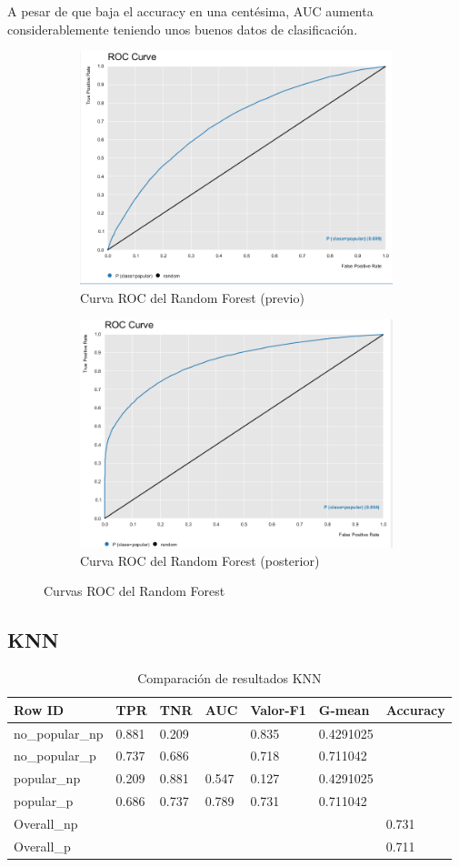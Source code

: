 A pesar de que baja el accuracy en una centésima, AUC aumenta considerablemente teniendo unos buenos datos de clasificación.

\begin{figure}[H]
	\begin{subfigure}{.5\textwidth}
		\centering
		\includegraphics[width=.4\linewidth]{roc-rf-p.png}
		\caption{Curva ROC del Random Forest (previo)}
		\label{fig:rcrfp}
	\end{subfigure}%
	\begin{subfigure}{.5\textwidth}
		\centering
		\includegraphics[width=.4\linewidth]{rc-rf.png}
		\caption{Curva ROC del Random Forest (posterior)}
		\label{fig:rcrf}
	\end{subfigure}
	\caption{Curvas ROC del Random Forest}
	\label{fig:rf}
\end{figure}

\subsection{KNN}

\begin{table}[H]
	\centering
	\begin{tabular}{|l|l|l|l|l|l|l|}
		\hline
		Row ID          & TPR   & TNR   & AUC   & Valor-F1 & G-mean    & Accuracy \\ \hline
		no\_popular\_np & 0.881 & 0.209 &       & 0.835    & 0.4291025 &          \\ \hline
		no\_popular\_p  & 0.737 & 0.686 &       & 0.718    & 0.711042  &          \\ \hline
		popular\_np     & 0.209 & 0.881 & 0.547 & 0.127    & 0.4291025 &          \\ \hline
		popular\_p      & 0.686 & 0.737 & 0.789 & 0.731    & 0.711042  &          \\ \hline
		Overall\_np     &       &       &       &          &           & 0.731    \\ \hline
		Overall\_p      &       &       &       &          &           & 0.711    \\ \hline
	\end{tabular}
	\caption{Comparación de resultados KNN}
	\label{tab:compknn}
\end{table}

